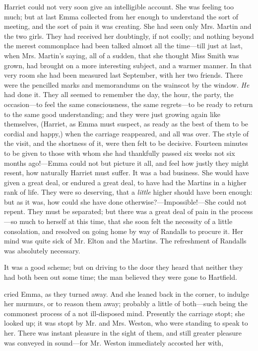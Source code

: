 Harriet could not very soon give an intelligible account. She was feeling too much; but at last Emma collected from her enough to understand the sort of meeting, and the sort of pain it was creating. She had seen only Mrs. Martin and the two girls. They had received her doubtingly, if not coolly; and nothing beyond the merest commonplace had been talked almost all the time---till just at last, when Mrs. Martin's saying, all of a sudden, that she thought Miss Smith was grown, had brought on a more interesting subject, and a warmer manner. In that very room she had been measured last September, with her two friends. There were the pencilled marks and memorandums on the wainscot by the window. {\em He} had done it. They all seemed to remember the day, the hour, the party, the occasion---to feel the same consciousness, the same regrets---to be ready to return to the same good understanding; and they were just growing again like themselves, (Harriet, as Emma must suspect, as ready as the best of them to be cordial and happy,) when the carriage reappeared, and all was over. The style of the visit, and the shortness of it, were then felt to be decisive. Fourteen minutes to be given to those with whom she had thankfully passed six weeks not six months ago!---Emma could not but picture it all, and feel how justly they might resent, how naturally Harriet must suffer. It was a bad business. She would have given a great deal, or endured a great deal, to have had the Martins in a higher rank of life. They were so deserving, that a {\em little} higher should have been enough: but as it was, how could she have done otherwise?---Impossible!---She could not repent. They must be separated; but there was a great deal of pain in the process---so much to herself at this time, that she soon felt the necessity of a little consolation, and resolved on going home by way of Randalls to procure it. Her mind was quite sick of Mr. Elton and the Martins. The refreshment of Randalls was absolutely necessary.

It was a good scheme; but on driving to the door they heard that neither  they had both been out some time; the man believed they were gone to Hartfield.

 cried Emma, as they turned away.  And she leaned back in the corner, to indulge her murmurs, or to reason them away; probably a little of both---such being the commonest process of a not ill-disposed mind. Presently the carriage stopt; she looked up; it was stopt by Mr. and Mrs. Weston, who were standing to speak to her. There was instant pleasure in the sight of them, and still greater pleasure was conveyed in sound---for Mr. Weston immediately accosted her with,

